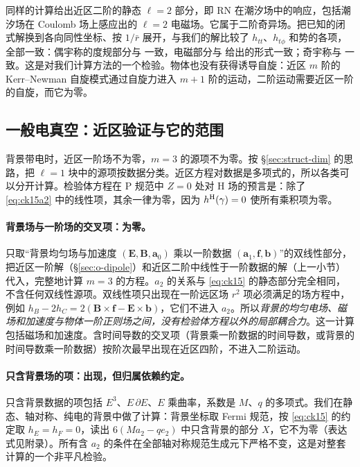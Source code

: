 \documentclass[11pt,a4paper]{ctexart}
\begin{document}
同样的计算给出近区二阶的静态 $\ell=2$ 部分，即 RN 在潮汐场中的响应，包括潮汐场在 Coulomb 场上感应出的 $\ell=2$ 电磁场。它属于二阶奇异场。把已知的闭式解换到各向同性坐标、按 $1/\bar r$ 展开，与我们的解比较了 $h_{tt}$、$h_{t\phi}$ 和势的各项，全部一致：偶宇称的度规部分与 \citet{CardosoEtAl2017} 一致，电磁部分与 \citet{RaiSantoni2024} 给出的形式一致；奇宇称与 \citet{CardosoEtAl2017} 一致。这是对我们计算方法的一个检验。物体也没有获得诱导自旋：近区 $m$ 阶的 Kerr--Newman 自旋模式通过自旋力进入 $m+1$ 阶的运动，二阶运动需要近区一阶的自旋，而它为零。

\subsection{一般电真空：近区验证与它的范围}\label{sec:second-ev}

背景带电时，近区一阶场不为零，$m=3$ 的源项不为零。按 \S\ref{sec:struct-dim} 的思路，把 $\ell=1$ 块中的源项按数据分类。近区方程对数据是多项式的，所以各类可以分开计算。检验体方程在 P 规范中 $Z=0$ 处对 H 场的预言是：除了 \eqref{eq:ck15a2} 中的线性项，其余一律为零，因为 $h^{\rm H}(\gamma)=0$ 使所有乘积项为零。

\paragraph{背景场与一阶场的交叉项：为零。}只取“背景均匀场与加速度 $(\boldsymbol E,\boldsymbol B,\boldsymbol a_0)$ 乘以一阶数据 $(\boldsymbol a_1,\boldsymbol f,\boldsymbol b)$”的双线性部分，把近区一阶解（\S\ref{sec:o-dipole}）和近区二阶中线性于一阶数据的解（上一小节）代入，完整地计算 $m=3$ 的方程。$a_2$ 的关系与 \eqref{eq:ck15} 的静态部分完全相同，不含任何双线性源项。双线性项只出现在一阶远区场 $r^2$ 项必须满足的场方程中，例如 $h_B-2h_C=2(\boldsymbol B\times\boldsymbol f-\boldsymbol E\times\boldsymbol b)$，它们不进入 $a_2$。所以\emph{背景的均匀电场、磁场和加速度与物体一阶正则场之间，没有检验体方程以外的局部耦合力}。这一计算包括磁场和加速度。含时间导数的交叉项（背景乘一阶数据的时间导数，或背景的时间导数乘一阶数据）按阶次最早出现在近区四阶，不进入二阶运动。

\paragraph{只含背景场的项：出现，但归属依赖约定。}只含背景数据的项包括 $E^3$、$E\,\partial E$、$E$ 乘曲率，系数是 $M$、$q$ 的多项式。我们在静态、轴对称、纯电的背景中做了计算：背景坐标取 Fermi 规范，按 \eqref{eq:ck15} 的约定取 $h_E=h_F=0$，读出 $6(Ma_2-qe_2)$ 中只含背景的部分 $X$，它不为零（表达式见附录）。所有含 $a_2$ 的条件在全部轴对称规范生成元下严格不变，这是对整套计算的一个非平凡检验。
\end{document}
